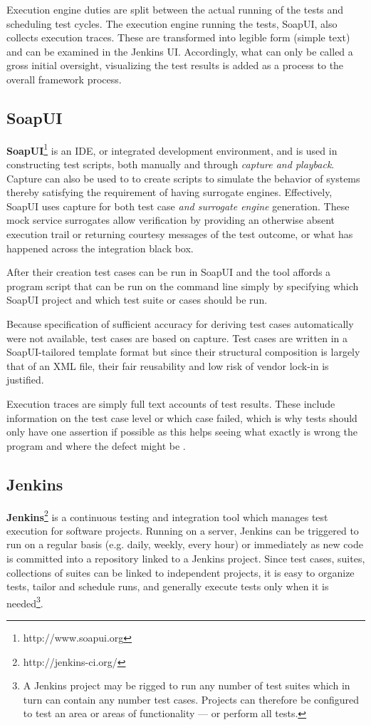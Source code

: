 \documentclass[12pt,a4paper,oneside,pdftex]{report}
\begin{document}
{Execution engine duties are split between the actual running of the tests and scheduling test cycles. The execution engine running the tests, SoapUI, also collects execution traces. These are transformed into legible form (simple text) and can be examined in the Jenkins UI. Accordingly, what can only be called a gross initial oversight, visualizing the test results is added as a process to the overall framework process.

\subsection{SoapUI}

\textbf{SoapUI}\footnote{http://www.soapui.org} is an IDE, or integrated development environment, and is used in constructing test scripts, both manually and through \emph{capture and playback}. Capture can also be used to to create scripts to simulate the behavior of systems thereby satisfying the requirement of having surrogate engines. Effectively, SoapUI uses capture for both test case \emph{and surrogate engine} generation. These mock service surrogates allow verification by providing an otherwise absent execution trail or returning courtesy messages of the test outcome, or what has happened across the integration black box.

After their creation test cases can be run in SoapUI and the tool affords a program script that can be run on the command line simply by specifying which SoapUI project and which test suite or cases should be run.

Because specification of sufficient accuracy for deriving test cases automatically were not available, test cases are based on capture. Test cases are written in a SoapUI-tailored template format but since their structural composition is largely that of an XML file, their fair reusability and low risk of vendor lock-in is justified. 

Execution traces are simply full text accounts of test results. These include information on the test case level or which case failed, which is why tests should only have one assertion if possible as this helps seeing what exactly is wrong the program and where the defect might be \citep{duvall2007continuous}.

\subsection{Jenkins}

\textbf{Jenkins}\footnote{http://jenkins-ci.org/} is a continuous testing and integration tool which manages test execution for software projects. Running on a server, Jenkins can be triggered to run on a regular basis (e.g. daily, weekly, every hour) or immediately as new code is committed into a repository linked to a Jenkins project. Since test cases, suites, collections of suites can be linked to independent projects, it is easy to organize tests, tailor and schedule runs, and generally execute tests only when it is needed\footnote{A Jenkins project may be rigged to run any number of test suites which in turn can contain any number test cases. Projects can therefore be configured to test an area or areas of functionality --- or perform all tests.}.

}
\end{document}
